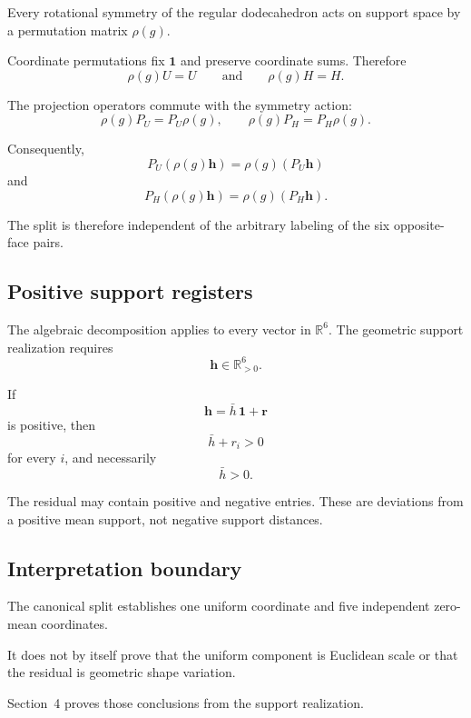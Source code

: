 Every rotational symmetry of the regular dodecahedron acts on support space
by a permutation matrix \(\rho(g)\).

Coordinate permutations fix \(\mathbf 1\) and preserve coordinate sums.
Therefore
\[
\rho(g)U=U
\qquad\text{and}\qquad
\rho(g)H=H.
\]

The projection operators commute with the symmetry action:
\[
\rho(g)P_U=P_U\rho(g),
\qquad
\rho(g)P_H=P_H\rho(g).
\]

Consequently,
\[
P_U(\rho(g)\mathbf h)
=
\rho(g)(P_U\mathbf h)
\]
and
\[
P_H(\rho(g)\mathbf h)
=
\rho(g)(P_H\mathbf h).
\]

The split is therefore independent of the arbitrary labeling of the six
opposite-face pairs.

\subsection{Positive support registers}

The algebraic decomposition applies to every vector in \(\mathbb R^6\).
The geometric support realization requires
\[
\mathbf h\in\mathbb R_{>0}^6.
\]

If
\[
\mathbf h
=
\bar h\,\mathbf 1+\mathbf r
\]
is positive, then
\[
\bar h+r_i>0
\]
for every \(i\), and necessarily
\[
\bar h>0.
\]

The residual may contain positive and negative entries. These are deviations
from a positive mean support, not negative support distances.

\subsection{Interpretation boundary}

The canonical split establishes one uniform coordinate and five independent
zero-mean coordinates.

It does not by itself prove that the uniform component is Euclidean scale
or that the residual is geometric shape variation.

Section~4 proves those conclusions from the support realization.
